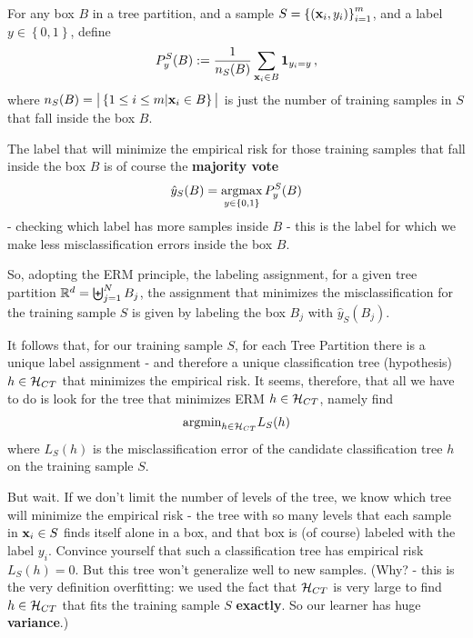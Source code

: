  For any box $B$ in a tree partition, and a sample $S=\left\{ (\mathbf{x}_i,y_i)
 \right\}_{i=1}^m$, and a label $y\in\left\{ 0,1 \right\}$, define
\[
  P^S_y(B) := \frac{1}{n_S(B)}\sum_{ \mathbf{x}_i \in B
  }\mathbf{1}_{y_i=y}\,,
\]
where $n_S(B) = \big|  \left\{ 1\leq i \leq m| \mathbf{x}_i\in B \right\}\big|$ is
just the number of training samples in $S$ that fall inside the box $B$. 

 The label that will
 minimize the empirical risk for those training samples that fall inside the box
 $B$ is of course the {\bf majority vote} 
 \[\hat{y}_S(B) = \operatorname*{argmax}_{y\in\left\{ 0,1
 \right\}} P^S_y(B)\]
 - checking which label has more samples inside $B$ - this
 is
 the label for which we make less misclassification errors inside the box $B$.


 So, adopting the ERM principle, the labeling assignment, for a given tree
 partition $\mathbb{R}^d=\biguplus_{j=1}^N B_j$, the assignment that minimizes the
 misclassification for the training sample $S$ is given by labeling the box $B_j$
 with $\hat{y}_S(B_j)$.
 
 It follows that, for our training sample $S$, 
 for each Tree Partition there is a unique label assignment - and therefore a
 unique classification tree (hypothesis) $h\in\mathcal{H}_{CT}$ that minimizes the
 empirical risk. It seems, therefore, that all we have to do is look for the
 tree that minimizes ERM $h\in\mathcal{H}_{CT}$, namely find 
 \[
   \text{argmin}_{h\in\mathcal{H}_{CT}} L_S(h)
 \]
 where $L_S(h)$ is the misclassification error of the candidate classification
 tree $h$ on the training sample $S$.

 But wait. If we don't limit the number of levels of the tree, we know which
 tree will minimize the empirical risk - the tree with so many levels that each
 sample in $\mathbf{x}_i\in S$ finds itself alone in a box, and that box is (of course) labeled
 with the label $y_i$. Convince yourself that such a classification tree has
 empirical risk $L_S(h)=0$. But this tree won't generalize well to new samples.
 (Why? - this is the very definition overfitting: we used the fact that
   $\mathcal{H}_{CT}$ is very large to find $h\in\mathcal{H}_{CT}$ that fits the training sample
 $S$ {\bf exactly}. So our learner has huge {\bf variance}.)

